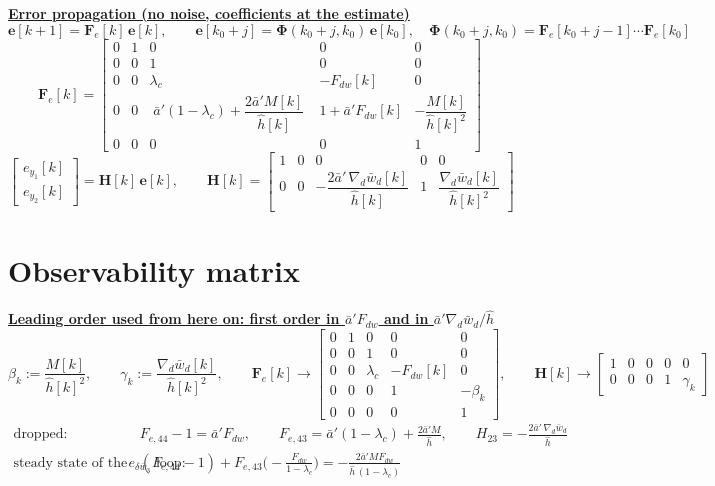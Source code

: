 \documentclass[11pt,a4paper]{ctexart}
\newcommand{\lc}{\lambda_c}
\newcommand{\ba}{\bar{a}}
\newcommand{\bw}{\bar{w}}
\newcommand{\ap}{\ba'}
\newcommand{\hh}{\hat{h}}
\newcommand{\hd}[1]{\par\bigskip\noindent\underline{\textbf{#1}}}
\begin{document}
\hd{Error propagation (no noise, coefficients at the estimate)}
\[
\mathbf{e}[k+1] = \mathbf{F}_e[k]\,\mathbf{e}[k], \qquad
\mathbf{e}[k_0+j] = \bm{\Phi}(k_0+j,k_0)\,\mathbf{e}[k_0], \quad \bm{\Phi}(k_0+j,k_0) = \mathbf{F}_e[k_0+j-1]\cdots\mathbf{F}_e[k_0]
\]
\[
\mathbf{F}_e[k] =
\begin{bmatrix}
0 & 1 & 0 & 0 & 0 \\
0 & 0 & 1 & 0 & 0 \\
0 & 0 & \lc & -F_{dw}[k] & 0 \\
0 & 0 & \;\ap(1-\lc) + \dfrac{2\ap M[k]}{\hh[k]}\; & 1 + \ap F_{dw}[k] & -\dfrac{M[k]}{\hh[k]^{2}} \\
0 & 0 & 0 & 0 & 1
\end{bmatrix}
\]
\[
\begin{bmatrix} e_{y_1}[k] \\ e_{y_2}[k] \end{bmatrix} = \mathbf{H}[k]\,\mathbf{e}[k], \qquad
\mathbf{H}[k] =
\begin{bmatrix}
1 & 0 & 0 & 0 & 0 \\
0 & 0 & -\dfrac{2\ap\,\nabla_d\bw_d[k]}{\hh[k]} & 1 & \dfrac{\nabla_d\bw_d[k]}{\hh[k]^{2}}
\end{bmatrix}
\]

\clearpage
\section{Observability matrix}

\hd{Leading order used from here on: first order in $\ap F_{dw}$ and in $\ap\nabla_d\bw_d/\hh$}
\[
\beta_k := \frac{M[k]}{\hh[k]^{2}}, \qquad
\gamma_k := \frac{\nabla_d\bw_d[k]}{\hh[k]^{2}}, \qquad
\mathbf{F}_e[k] \to
\begin{bmatrix}
0 & 1 & 0 & 0 & 0 \\
0 & 0 & 1 & 0 & 0 \\
0 & 0 & \lc & -F_{dw}[k] & 0 \\
0 & 0 & 0 & 1 & -\beta_k \\
0 & 0 & 0 & 0 & 1
\end{bmatrix}, \qquad
\mathbf{H}[k] \to
\begin{bmatrix}
1 & 0 & 0 & 0 & 0 \\
0 & 0 & 0 & 1 & \gamma_k
\end{bmatrix}
\]
\[
\begin{aligned}
\text{dropped:}\quad & F_{e,44} - 1 = \ap F_{dw}, \qquad F_{e,43} = \ap(1-\lc) + \frac{2\ap M}{\hh}, \qquad H_{23} = -\frac{2\ap\,\nabla_d\bw_d}{\hh} \\
\text{steady state of the } e_{\delta\bw_3} \text{ loop:}\quad & (F_{e,44} - 1) + F_{e,43}\Big(-\frac{F_{dw}}{1-\lc}\Big) = -\frac{2\ap M F_{dw}}{\hh\,(1-\lc)}
\end{aligned}
\]
\end{document}
